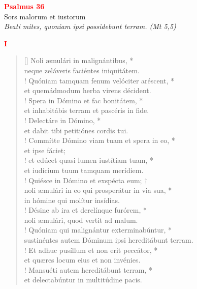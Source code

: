 


\def\greinitialformat#1{%
{\fontsize{39}{39}\selectfont #1}%
}




\vspace{0.3cm}
\begin{center}
 \textcolor{red}{\large \bf Psalmus 36}\\
Sors malorum et iustorum\\
\textit{\small Beati mites, quoniam ipsi possidebunt terram. (Mt 5,5)}
\end{center}
\begin{center}
\textcolor{red}{\bf I}
\end{center}
\begin{verse}[\versewidth]
Noli æmulári in malignántibus, *\\
neque zeláveris faciéntes iniquitátem.\\!
\vin Quóniam tamquam fenum velóciter aréscent, *\\
\vin et quemádmodum herba virens décident.\\!
Spera in Dómino et fac bonitátem, *\\
et inhabitábis terram et pascéris in fide.\\!
\vin Delectáre in Dómino, *\\
\vin et dabit tibi petitiónes cordis tui.\\!
Commítte Dómino viam tuam et spera in eo, *\\
et ipse fáciet;\\!
\vin et edúcet quasi lumen iustítiam tuam, *\\
\vin et iudícium tuum tamquam merídiem.\\!
Quiésce in Dómino et exspécta eum; †\\
noli æmulári in eo qui prosperátur in via sua, *\\
in hómine qui molítur insídias.\\!
\vin Désine ab ira et derelínque furórem, *\\
\vin noli æmulári, quod vertit ad malum.\\!
Quóniam qui malignántur exterminabúntur, *\\
sustinéntes autem Dóminum ipsi hereditábunt terram.\\!
\vin Et adhuc pusíllum et non erit peccátor, *\\
\vin et quæres locum eius et non invénies.\\!
Mansuéti autem hereditábunt terram, *\\
et delectabúntur in multitúdine pacis.\\
\end{verse}
